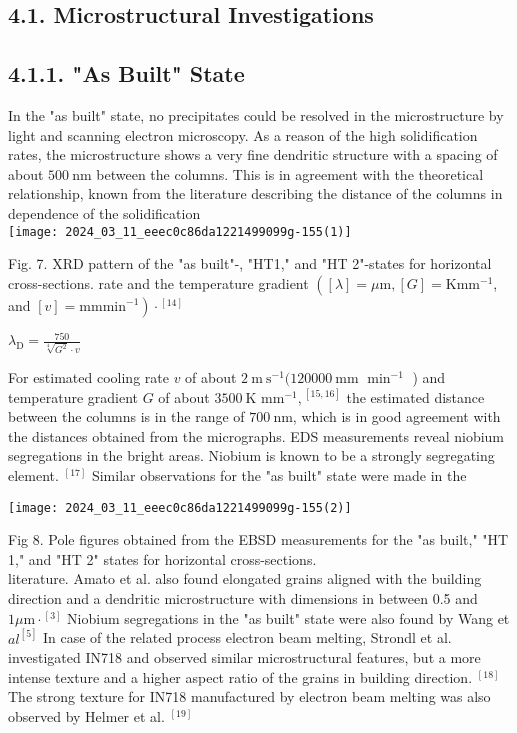 \documentclass[10pt]{article}
\begin{document}
\subsection*{4.1. Microstructural Investigations}
\subsection*{4.1.1. "As Built" State}
In the "as built" state, no precipitates could be resolved in the microstructure by light and scanning electron microscopy. As a reason of the high solidification rates, the microstructure shows a very fine dendritic structure with a spacing of about $500 \mathrm{~nm}$ between the columns. This is in agreement with the theoretical relationship, known from the literature describing the distance of the columns in dependence of the solidification\\
\texttt{[image: 2024\_03\_11\_eeec0c86da1221499099g-155(1)]}

Fig. 7. XRD pattern of the "as built"-, "HT1," and "HT 2"-states for horizontal cross-sections. rate and the temperature gradient $\left([\lambda]=\mu \mathrm{m},[G]=\mathrm{K} \mathrm{mm}^{-1}\right.$, and $\left.[v]=\mathrm{mm} \mathrm{min}^{-1}\right) \cdot{ }^{[14]}$

$\lambda_{\mathrm{D}}=\frac{750}{\sqrt[4]{G^{2}} \cdot v}$

For estimated cooling rate $v$ of about $2 \mathrm{~m} \mathrm{~s}^{-1}(120000 \mathrm{~mm}$ $\min ^{-1}$ ) and temperature gradient $G$ of about $3500 \mathrm{~K}$ $\mathrm{mm}^{-1},{ }^{[15,16]}$ the estimated distance between the columns is in the range of $700 \mathrm{~nm}$, which is in good agreement with the distances obtained from the micrographs. EDS measurements reveal niobium segregations in the bright areas. Niobium is known to be a strongly segregating element. ${ }^{[17]}$ Similar observations for the "as built" state were made in the

\begin{center}
\texttt{[image: 2024\_03\_11\_eeec0c86da1221499099g-155(2)]}
\end{center}

Fig 8. Pole figures obtained from the EBSD measurements for the "as built," "HT 1," and "HT 2" states for horizontal cross-sections.\\
literature. Amato et al. also found elongated grains aligned with the building direction and a dendritic microstructure with dimensions in between 0.5 and $1 \mu \mathrm{m} \cdot{ }^{[3]}$ Niobium segregations in the "as built" state were also found by Wang et $a l^{[5]}$ In case of the related process electron beam melting, Strondl et al. investigated IN718 and observed similar microstructural features, but a more intense texture and a higher aspect ratio of the grains in building direction. ${ }^{[18]}$ The strong texture for IN718 manufactured by electron beam melting was also observed by Helmer et al. ${ }^{[19]}$
\end{document}
